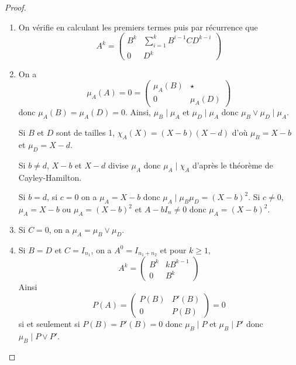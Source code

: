 \documentclass[12pt]{article}
\begin{document}
\begin{proof}
	\phantom{}
	\begin{enumerate}
		\item On vérifie en calculant les premiers termes puis par récurrence que 
		\begin{equation}
			\boxed{A^{k}=\begin{pmatrix}
				B^{k}&\sum_{i=1}^{k}B^{i-1}CD^{k-i}\\0&D^{k}
			\end{pmatrix}}
		\end{equation}

		\item On a 
		\begin{equation}
			\mu_{A}(A)=0=\begin{pmatrix}
				\mu_{A}(B)&\star\\0&\mu_{A}(D)
			\end{pmatrix}
		\end{equation}
		donc $\mu_{A}(B)=\mu_{A}(D)=0$. Ainsi, $\mu_{B}\mid \mu_{A}$ et $\mu_{D}\mid\mu_{A}$ donc $\mu_{B}\vee\mu_{D}\mid \mu_{A}$.

		Si $B$ et $D$ sont de tailles 1, $\chi_{A}(X)=(X-b)(X-d)$ d'où $\mu_{B}=X-b$ et $\mu_{D}=X-d$.

		Si $b\neq d$, $X-b$ et $X-d$ divise $\mu_{A}$ donc $\mu_{A}\mid \chi_{A}$ d'après le théorème de Cayley-Hamilton.

		Si $b=d$, si $c=0$ on a $\mu_{A}=X-b$ donc $\mu_{A}\mid\mu_{B}\mu_{D}=(X-b)^{2}$. Si $c\neq0$, $\mu_{A}=X-b$ ou $\mu_{A}=(X-b)^{2}$ et $A-bI_{n}\neq0$ donc $\mu_{A}=(X-b)^{2}$.

		\item Si $C=0$, on a $\mu_{A}=\mu_{B}\vee\mu_{D}$.
		\item Si $B=D$ et $C=I_{n_{1}}$, on a $A^{0}=I_{n_{1}+n_{2}}$ et pour $k\geqslant1$,
		\begin{equation}
			A^{k}=\begin{pmatrix}
				B^{k}&kB^{k-1}\\
				0&B^{k}
			\end{pmatrix}
		\end{equation}
		Ainsi
		\begin{equation}
			P(A)=\begin{pmatrix}
				P(B)&P'(B)\\
				0&P(B)
			\end{pmatrix}=0
		\end{equation}
		si et seulement si $P(B)=P'(B)=0$ donc $\mu_{B}\mid P$ et $\mu_{B}\mid P'$ donc $\mu_{B}\mid P\vee P'$.


\end{enumerate}
\end{proof}
\end{document}
